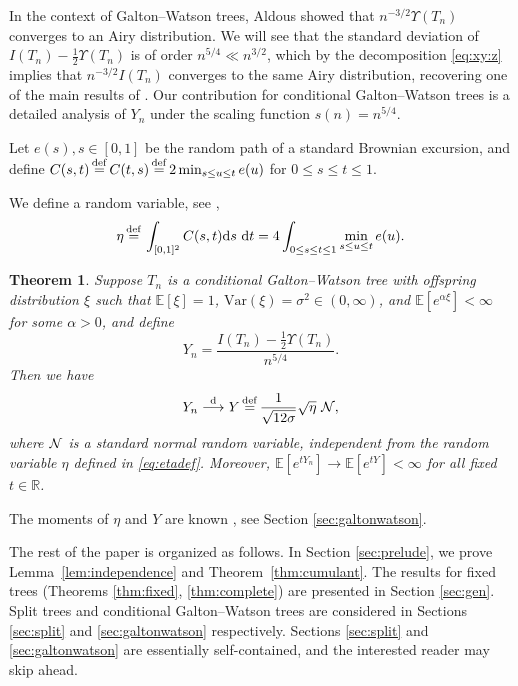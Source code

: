 \documentclass[11pt]{article}
\newcommand{\E}[1]{\mathbb{E} \left[#1\right]}
\newcommand{\Va}[1]{{\mathrm{Var}}\left(#1\right)}
\newcommand\cN{{\cal N}}
\def\R{\mathbb{R}}
\def\YY{Y}
\def\U{\Upsilon}
\def\a{\alpha}
\def\s{\sigma}
\newtheorem{theorem}{Theorem}
\numberwithin{theorem}{section}
\theoremstyle{definition}
\newcommand{\inlaw}{\dto}%
\newcommand{\eqd}{\,{\buildrel {\mathrm{def}} \over =}\,}
\numberwithin{equation}{section}
\newcommand{\refT}[1]{Theorem~\ref{#1}}
\newcommand{\refL}[1]{Lemma~\ref{#1}}
\newcommand{\too}{\longrightarrow}
\newcommand\dto{\overset{\mathrm{d}}{\too}}
\begin{document}
In the context of Galton--Watson trees, Aldous \cite[Corollary 9]{a91} showed that $n^{-3/2}\U(T_n)$
converges to an Airy distribution. We will see that the standard deviation of $I(T_n) -
\frac12\U(T_n)$ is of order
$n^{5/4} \ll n^{3/2}$, which by the decomposition \eqref{eq:xy:z} implies that
$n^{-3/2}I(T_n)$ converges to the same Airy distribution, recovering one of the main results of
\citet[Theorem 5.3]{ps12}. Our contribution for conditional Galton--Watson trees
is a detailed analysis of $\YY_n$ under the scaling function $s(n) = n^{5/4}$.

Let $e(s), s\in[0,1]$ be the random path of a standard Brownian excursion,
and define $C(s, t)\eqd \allowbreak C(t,s) \eqd 2\min_{s\leq u\leq t} e(u)$ for
$0\le s\le t\le 1$.

We define a random variable, see \cite{j02},
\begin{equation}\label{eq:etadef} 
    \eta \eqd \int_{[0,1]^2} C(s, t) \mathrm ds\ \mathrm dt
=4\int_{0\le s\le t\le 1}\min_{s\leq u\leq t} e(u).
\end{equation} 

\begin{theorem}\label{thm:galtonwatson}
Suppose $T_n$ is a conditional Galton--Watson tree with offspring distribution $\xi$ such that
$\E{\xi} = 1$, $\Va{\xi} = \s^2 \in (0, \infty)$, 
and $\E{e^{\alpha\xi}}<\infty$ for some $\a>0$, 
and define
$$
\YY_n = \frac{I(T_n) - \frac12 \U(T_n)}{n^{5/4}}.
$$
Then we have
\begin{equation}\label{gw}
  \YY_n \inlaw \YY \eqd \frac{1}{\sqrt{12\s}} \sqrt{\eta}\ \cN,
\end{equation}
where $\cN$ is a standard normal random variable, independent from the random variable $\eta$
defined in \eqref{eq:etadef}.
Moreover, \(\E{e^{t\YY_n}} \to \E{e^{t\YY}} < \infty\) for all fixed \(t \in \R\). 
\end{theorem}

The moments of $\eta$ and $Y$ are known \cite{MR2108865}, see
Section \ref{sec:galtonwatson}.


The rest of the paper is organized as follows.  In Section \ref{sec:prelude}, we prove
\refL{lem:independence} and \refT{thm:cumulant}. The results for fixed trees (Theorems
\ref{thm:fixed}, \ref{thm:complete}) are presented in Section \ref{sec:gen}.
Split trees and conditional Galton--Watson trees are considered in Sections \ref{sec:split} and
\ref{sec:galtonwatson} respectively. Sections \ref{sec:split} and \ref{sec:galtonwatson} are
essentially self-contained, and the interested reader may skip ahead.
\end{document}
